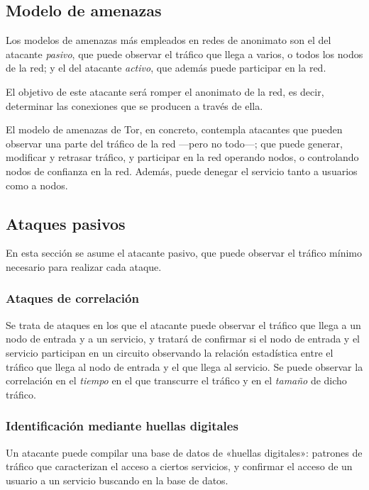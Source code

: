 \documentclass[
  a4paper,
  12pt,
  spanish,
]{scrartcl}
\begin{document}
\subsection{Modelo de amenazas}

Los modelos de amenazas más empleados en redes de anonimato son el del atacante
\emph{pasivo}, que puede observar el tráfico que llega a varios, o todos los
nodos de la red; y el del atacante \emph{activo}, que además puede participar en
la red.

El objetivo de este atacante será romper el anonimato de la red, es decir,
determinar las conexiones que se producen a través de ella.

El modelo de amenazas de Tor, en concreto, contempla atacantes que pueden
observar una parte del tráfico de la red ---pero no todo---; que puede generar,
modificar y retrasar tráfico, y participar en la red operando nodos, o
controlando nodos de confianza en la red. Además, puede denegar el servicio
tanto a usuarios como a nodos.

\subsection{Ataques pasivos}

En esta sección se asume el atacante pasivo, que puede observar el tráfico
mínimo necesario para realizar cada ataque.

\subsubsection{Ataques de correlación} \label{corrat}

Se trata de ataques en los que el atacante puede observar el tráfico que llega a
un nodo de entrada y a un servicio, y tratará de confirmar si el nodo de entrada
y el servicio participan en un circuito observando la relación estadística entre
el tráfico que llega al nodo de entrada y el que llega al servicio. Se puede
observar la correlación en el \emph{tiempo} en el que transcurre el tráfico y en
el \emph{tamaño} de dicho tráfico.

\subsubsection{Identificación mediante huellas digitales}

Un atacante puede compilar una base de datos de «huellas digitales»: patrones de
tráfico que caracterizan el acceso a ciertos servicios, y confirmar el acceso de
un usuario a un servicio buscando en la base de datos.
\end{document}
